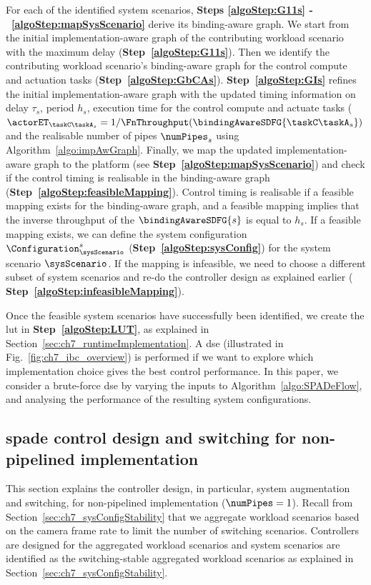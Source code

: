 For each of the identified system scenarios, \textbf{Steps \ref{algoStep:G11s} -~\ref{algoStep:mapSysScenario}} derive its binding-aware graph.
We start from the initial implementation-aware graph of the contributing workload scenario with the maximum delay (\textbf{Step~\ref{algoStep:G11s}}). Then we identify the contributing workload scenario's binding-aware graph for the control compute and actuation tasks (\textbf{Step~\ref{algoStep:GbCAs}}).
\textbf{Step~\ref{algoStep:GIs}} refines the initial implementation-aware graph with the updated timing information on delay $\tau_s$, period $h_s$, execution time for the control compute and actuate tasks ($\actorET_{\taskC\taskA_s}=1/\FnThroughput(\bindingAwareSDFG{\taskC\taskA_s})$ and the realisable number of pipes $\numPipes_s$ using Algorithm~\ref{algo:impAwGraph}.
Finally, we map the updated implementation-aware graph to the platform (see \textbf{Step~\ref{algoStep:mapSysScenario}}) and check if the control timing is realisable in the binding-aware graph (\textbf{Step~\ref{algoStep:feasibleMapping}}).
Control timing is realisable if a feasible mapping exists for the binding-aware graph, and a feasible mapping implies that the inverse throughput of the $\bindingAwareSDFG{s}$ is equal to $h_s$.
If a feasible mapping exists, we can define the system configuration $\Configuration_{\sysScenario}^s$ (\textbf{Step~\ref{algoStep:sysConfig}}) for the system scenario $\sysScenario$.
If the mapping is infeasible, we need to choose a different subset of system scenarios and re-do the controller design as explained earlier (\textbf{ Step~\ref{algoStep:infeasibleMapping}}).

Once the feasible system scenarios have successfully been identified, we create the \gls{lut} in \textbf{Step~\ref{algoStep:LUT}}, as explained in Section~\ref{sec:ch7_runtimeImplementation}.
A \gls{dse} (illustrated in Fig.~\ref{fig:ch7_ibc_overview}) is performed if we want to explore which implementation choice gives the best control performance. In this paper, we consider a brute-force \gls{dse} by varying the inputs to Algorithm~\ref{algo:SPADeFlow}, and analysing the performance of the resulting system configurations.

\subsection{\texorpdfstring{\Gls{spade}}{SPADe} control design and switching for non-pipelined implementation}
\label{sec:ch7_NEW_SPADeNP}
\label{sec:ch7_NEW_SPADe_NP_Controller}
This section explains the controller design, in particular, system augmentation and switching, for non-pipelined implementation ($\numPipes=1$).
Recall from Section~\ref{sec:ch7_sysConfigStability} that we aggregate workload scenarios based on the camera frame rate to limit the number of switching scenarios. 
Controllers are designed for the aggregated workload scenarios and system scenarios are identified as the switching-stable aggregated workload scenarios as explained in Section~\ref{sec:ch7_sysConfigStability}.

